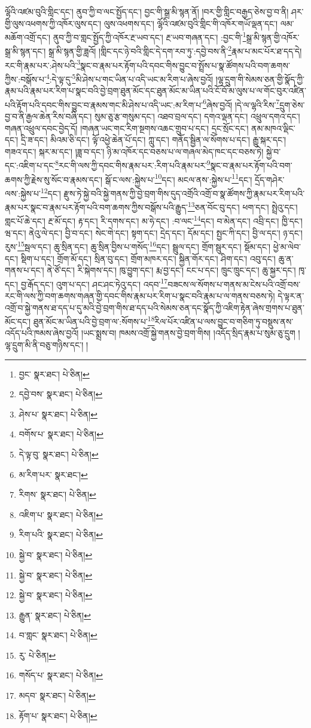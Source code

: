 ལྷོའི་འཛམ་བུའི་གླིང་དང་། ནུབ་ཀྱི་བ་ལང་སྤྱོད་དང་། བྱང་གི་སྒྲ་མི་སྙན་ནོ། །བར་གྱི་གླིང་བརྒྱད་ཅེས་བྱ་བ་ནི། ཤར་གྱི་ལུས་འཕགས་ཀྱི་འཁོར་ལུས་དང་། ལུས་འཕགས་དང་། ལྷོའི་འཛམ་བུའི་གླིང་གི་འཁོར་གཡོ་ལྡན་དང་། ལམ་མཆོག་འགྲོ་དང་། ནུབ་ཀྱི་བ་གླང་སྤྱོད་ཀྱི་འཁོར་རྔ་ཡབ་དང་། རྔ་ཡབ་གཞན་དང་། :བྱང་གི་\footnote{བྱང་  སྣར་ཐང་།  པེ་ཅིན། }སྒྲ་མི་སྙན་གྱི་འཁོར་སྒྲ་མི་སྙན་དང་། སྒྲ་མི་སྙན་གྱི་ཟླའོ། །གླིང་དང་ཉེ་བའི་གླིང་དེ་དག་རབ་ཏུ་:དབྱེ་བས་ནི་\footnote{དབྱེ་བས་  སྣར་ཐང་།  པེ་ཅིན། }རྣམ་པ་མང་པོར་ཐ་དད་དེ། རང་གི་རྣམ་པར་:ཤེས་པའི་\footnote{ཤེས་པ་  སྣར་ཐང་།  པེ་ཅིན། }སྣང་བ་རྣམ་པར་རྟོག་པའི་དབང་གིས་བྱུང་བ་སྤྲོས་པ་སྣ་ཚོགས་པའི་བག་ཆགས་ཀྱིས་:བསྒོས་པ་\footnote{བགོས་པ་  སྣར་ཐང་།  པེ་ཅིན། }:དེ་ལྟ་དུ་\footnote{དེ་ལྟ་བུ་  སྣར་ཐང་།  པེ་ཅིན། }མི་ཤེས་པ་གང་ཡིན་པ་འདི་ཡང་མ་རིག་པ་ཞེས་བྱའོ། །ལྷ་དྲུག་གི་སེམས་ཅན་གྱི་སྣོད་ཀྱི་རྣམ་པའི་རྣམ་པར་རིག་པ་སྣང་བའི་བྱེ་བྲག་ཐུན་མོང་དང་ཐུན་མོང་མ་ཡིན་པའི་ངོ་བོ་མ་ལུས་པ་ལ་གོང་བུར་འཛིན་པའི་རྟོག་པའི་དབང་གིས་བྱུང་བ་རྣམས་གང་མི་ཤེས་པ་འདི་ཡང་:མ་རིག་པ་\footnote{མ་རིག་པར་  སྣར་ཐང་། }ཞེས་བྱའོ། །དེ་ལ་ལྷའི་རིས་\footnote{རིགས་  སྣར་ཐང་།  པེ་ཅིན། }དྲུག་ཅེས་བྱ་བ་ནི་རྒྱལ་ཆེན་རིས་བཞི་དང་། སུམ་ཅུ་རྩ་གསུམ་དང་། འཐབ་བྲལ་དང་། དགའ་ལྡན་དང་། འཕྲུལ་དགའ་དང་། གཞན་འཕྲུལ་དབང་བྱེད་དོ། །གཞན་ཡང་གང་རིག་སྔགས་འཆང་གྲུབ་པ་དང་། དྲང་སྲོང་དང་། ནམ་མཁའ་ལྡིང་དང་། དྲི་ཟ་དང་། མིའམ་ཅི་དང་། ལྟོ་འཕྱེ་ཆེན་པོ་དང་། ཀླུ་དང་། གནོད་སྦྱིན་ལ་སོགས་པ་དང་། རྒྱུ་སྐར་དང་། གཟའ་དང་། སྐར་མ་དང་། །ཟླ་བ་དང་། ཉི་མ་འཁོར་དང་བཅས་པ་ལ་གཞལ་མེད་ཁང་དང་བཅས་ཏེ། སྐྱེ་བ་དང་:འཇིག་པ་དང་\footnote{འཇིག་པ་  སྣར་ཐང་།  པེ་ཅིན། }རང་གི་ལས་ཀྱི་དབང་གིས་རྣམ་པར་:རིག་པའི་རྣམ་པར་\footnote{རིག་པའི་  སྣར་ཐང་།  པེ་ཅིན། }སྣང་བ་རྣམ་པར་རྟོག་པའི་བག་ཆགས་ཀྱི་རྗེས་སུ་སོང་བ་རྣམས་དང་། སྒོ་ང་ལས་:སྐྱེས་པ་\footnote{སྐྱེ་བ་  སྣར་ཐང་།  པེ་ཅིན། }དང་། མངལ་ནས་:སྐྱེས་པ་\footnote{སྐྱེ་བ་  སྣར་ཐང་།  པེ་ཅིན། }དང་། དྲོད་གཤེར་ལས་:སྐྱེས་པ་\footnote{སྐྱེ་བ་  སྣར་ཐང་།  པེ་ཅིན། }དང་། རྫུས་ཏེ་སྐྱེ་བའི་སྐྱེ་གནས་ཀྱི་བྱེ་བྲག་གིས་དུད་འགྲོའི་འགྲོ་བ་སྣ་ཚོགས་ཀྱི་རྣམ་པར་རིག་པའི་རྣམ་པར་སྣང་བ་རྣམ་པར་རྟོག་པའི་བག་ཆགས་ཀྱིས་བསྒོས་པའི་རྒྱུད་\footnote{རྒྱུན་  སྣར་ཐང་།  པེ་ཅིན། }ཅན་བོང་བུ་དང་། ཕག་དང་། སྤྲེའུ་དང་། གླང་པོ་ཆེ་དང་། རྔ་མོ་དང་། རྟ་དང་། རི་དགས་དང་། མ་ཧེ་དང་། :བ་ལང་\footnote{བ་གླང་  སྣར་ཐང་།  པེ་ཅིན། }དང་། བ་མེན་དང་། འབྲི་དང་། ཁྱི་དང་། ཝ་དང་། ནེའུ་ལེ་དང་། བྱི་བ་དང་། སེང་གེ་དང་། སྟག་དང་། དྲེད་དང་། དོམ་དང་། སྤྱང་ཀི་དང་། བྱི་ལ་དང་། ཉ་དང་། རུས་\footnote{རུ་  པེ་ཅིན། }སྦལ་དང་། ཆུ་སྲིན་དང་། ཆུ་སྲིན་བྱིས་པ་གསོད་\footnote{གསོད་པ་  སྣར་ཐང་།  པེ་ཅིན། }དང་། སྦྲུལ་དང་། གྲོག་སྦུར་དང་། སྡོམ་དང་། ཕྱེ་མ་ལེབ་དང་། སྡིག་པ་དང་། གྲོག་མོ་དང་། སྲིན་བུ་དང་། གྲོག་མཁར་དང་། སྐྱིན་གོར་དང་། ཤིག་དང་། འབུ་དང་། ཆུ་ན་གནས་པ་དང་། ནེ་ཙོ་དང་། རི་སྐེགས་དང་། ཁུ་བྱུག་དང་། རྨ་བྱ་དང་། ངང་པ་དང་། ཁྲུང་ཁྲུང་དང་། ཆུ་སྐྱར་དང་། ཁྭ་དང་། བྱ་རྒོད་དང་། འུག་པ་དང་། ཤང་ཤང་ཏེའུ་དང་། འདབ་\footnote{མདབ་  སྣར་ཐང་།  པེ་ཅིན། }བཟངས་ལ་སོགས་པ་གནས་མ་ངེས་པའི་འགྲོ་བས་རང་གི་ལས་ཀྱི་བག་ཆགས་གཞན་གྱི་དབང་གིས་རྣམ་པར་རིག་པ་སྣང་བའི་རྣམ་པ་ལ་གནས་བཅས་ཏེ། དེ་ལྟར་ན་འགྲོ་བ་སྐྱེ་གནས་ཐ་དད་པ་དུ་མའི་བྱེ་བྲག་གིས་ཐ་དད་པའི་སེམས་ཅན་དང་སྣོད་ཀྱི་འཇིག་རྟེན་ཞེས་གྲགས་པ་ཐུན་མོང་དང་། ཐུན་མོང་མ་ཡིན་པའི་བྱེ་བྲག་ལ་:སོགས་པ་\footnote{རྟོག་པ་  སྣར་ཐང་།  པེ་ཅིན། }རིལ་པོར་འཛིན་པ་ལས་བྱུང་བ་གཅིག་ཏུ་བསྡུས་ནས་འདོད་པའི་ཁམས་ཞེས་བྱའོ། །ཡང་སྨྲས་བ། ཁམས་འགྲོ་སྐྱེ་གནས་བྱེ་བྲག་གིས། །འདོད་སྲིད་རྣམ་པ་སུམ་ཅུ་དྲུག །ལྷ་དྲུག་མི་ནི་བཅུ་གཉིས་དང་། །
